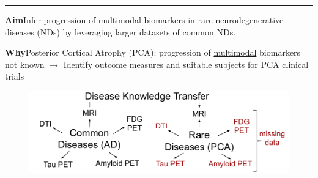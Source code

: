 \documentclass[portrait,a0,final,20pt]{a0poster}
\newcommand{\fnt}[1]{\LARGE{#1}}
\begin{document}
\fnt{


\newcommand{\lp}{\lambda_{d_i}^{k}}
\newcommand{\lpuu}{\lambda_{d_i}^{k,(u)}}
\newcommand{\lpum}{\lambda_{d_i}^{k,(u-1)}}

\newcommand{\cmark}{\ding{51}}%
\newcommand{\xmark}{\ding{55}}%

\newcommand{\yes}{{\LARGE \textcolor{green!50!black}{\cmark} \par}}
\newcommand{\no}{{\LARGE \textcolor{red}{\xmark} \par}}

\vspace{0.2em}
\hrule
\vspace{0.2em}

\newcommand{\heading}[1]{\noindent\textbf{\Huge{#1}}}

\begin{multicols}{2}							
\raggedcolumns							%

\pagenumbering{gobble}

\vspace{-3em}

\heading{Aim}\;\;\;\;Infer progression of multimodal biomarkers in rare neurodegenerative diseases (NDs) by leveraging larger datasets of common NDs.


\heading{Why}\;\;\;\;Posterior Cortical Atrophy (PCA): progression of \underline{multimodal} biomarkers not known $\rightarrow$ Identify outcome measures and suitable subjects for PCA clinical trials

\columnbreak

% 
% 
%  
%   
%  

\begin{figure}[H]
 \centering
 \includegraphics[width=\columnwidth]{DKT_data_availability}
\end{figure}



\end{multicols}}
\end{document}
